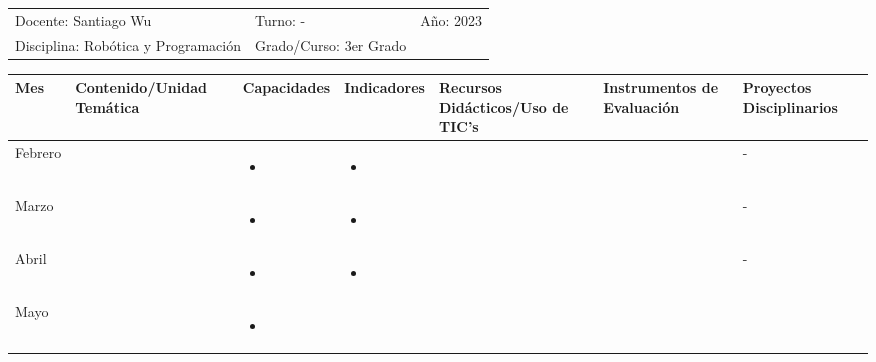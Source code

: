 \documentclass[landscape, a4paper, 10pt]{article}
\newcommand{\smallcellwidth}{0.7in}
\newcommand{\normalcellwidth}{1.2in}
\newcommand{\bigcellwidth}{2.0in}
\newcommand{\profesor}{Santiago Wu}
\newcommand{\discipline}{Robótica y Programación}
\newcommand{\currentyear}{2023}
\begin{document}
	\begin{tabularx}{\textwidth}{ >{\raggedright\arraybackslash}X >{\raggedright\arraybackslash}X >{\raggedright\arraybackslash}X }
		Docente: \profesor &
		Turno: - &
		Año: \currentyear \\
		Disciplina: \discipline &
		Grado/Curso: 3er Grado &
		 \\
	\end{tabularx}
	\centering
	\begin{longtable}{|m{\smallcellwidth}|p{\normalcellwidth}|p{\bigcellwidth}|p{\bigcellwidth}|p{\normalcellwidth}|p{\normalcellwidth}|p{\normalcellwidth}|}
		\hline
		\textbf{Mes} &
		\textbf{Contenido/Unidad Temática} &
		\textbf{Capacidades} &
		\textbf{Indicadores} &
		\textbf{Recursos Didácticos/Uso de TIC's} &
		\textbf{Instrumentos de Evaluación} &
		\textbf{Proyectos Disciplinarios} \\
		\hline
		\endhead
		Febrero &
		 &
		\begin{itemize}
			\item 
		\end{itemize} &
		\begin{itemize}
			\item 
		\end{itemize} &
		  &
		  &
		 - \\
		\hline
		Marzo &
		 &
		\begin{itemize}
			\item 
		\end{itemize} &
		\begin{itemize}
			\item 
		\end{itemize} &
		  &
		  &
		 - \\
		\hline
		Abril &
		 &
		\begin{itemize}
			\item 
		\end{itemize} &
		\begin{itemize}
			\item 
		\end{itemize} &
		  &
		  &
		 - \\
		\hline
		Mayo &
		 &
		\begin{itemize}
			\item 
		\end{itemize} &
		\begin{itemize}

\end{itemize}
\end{longtable}
\end{document}
